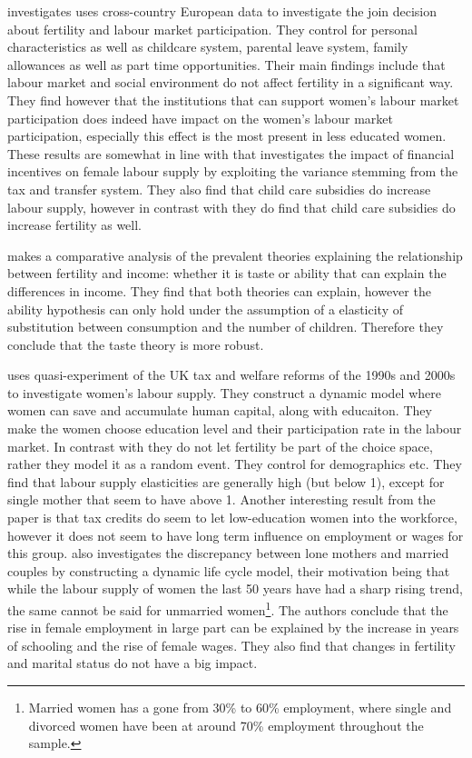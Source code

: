 \textcite{del_boca_motherhood_2009} investigates uses cross-country European data to investigate the join decision about fertility and labour market participation. They control for personal characteristics as well as childcare system, parental leave system, family allowances as well as part time opportunities. Their main findings include that labour market and social environment do not affect fertility in a significant way. They find however that the institutions that can support women's labour market participation does indeed have impact on the women's labour market participation, especially this effect is the most present in less educated women. These results are somewhat in line with \textcite{haan_can_2009} that investigates the impact of financial incentives on female labour supply by exploiting the variance stemming from the tax and transfer system. They also find that child care subsidies do increase labour supply, however in contrast with \textcite{del_boca_motherhood_2009} they do find that child care subsidies do increase fertility as well.

\textcite{jones_fertility_2008} makes a comparative analysis of the prevalent theories explaining the relationship between fertility and income: whether it is taste or ability that can explain the differences in income. They find that both theories can explain, however the ability hypothesis can only hold under the assumption of a elasticity of substitution between consumption and the number of children. Therefore they conclude that the taste theory is more robust.

\textcite{blundell_female_2016} uses quasi-experiment of the UK tax and welfare reforms of the 1990s and 2000s to investigate women's labour supply. They construct a dynamic model where women can save and accumulate human capital, along with educaiton. They make the women choose education level and their participation rate in the labour market. In contrast with \textcite{francesconi_joint_2002} they do not let fertility be part of the choice space, rather they model it as a random event. They control for demographics etc. They find that labour supply elasticities are generally high (but below 1), except for single mother that seem to have above 1. Another interesting result from the paper is that tax credits do seem to let low-education women into the workforce, however it does not seem to have long term influence on employment or wages for this group. \textcite{eckstein_dynamic_2011} also investigates the discrepancy between lone mothers and married couples by constructing a dynamic life cycle model, their motivation being that while the labour supply of women the last 50 years have had a sharp rising trend, the same cannot be said for unmarried women\footnote{Married women has a gone from 30\% to 60\% employment, where single and divorced women have been at around 70\% employment throughout the sample.}. The authors conclude that the rise in female employment in large part can be explained by the increase in years of schooling and the rise of female wages. They also find that changes in fertility and marital status do not have a big impact. 

